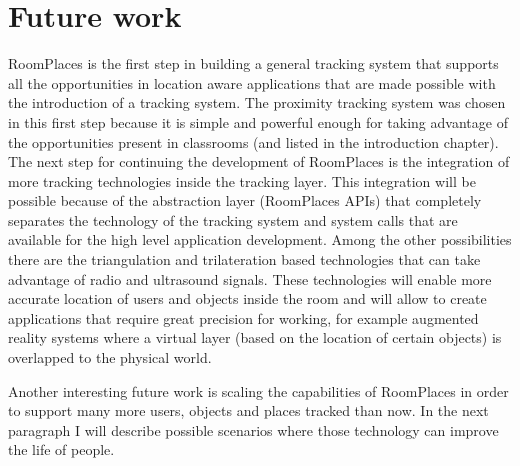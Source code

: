 \section{Future work}

RoomPlaces is the first step in building a general tracking system that supports all the opportunities in location aware applications that are made possible with the introduction of a tracking system. The proximity tracking system was chosen in this first step because it is simple and powerful enough for taking advantage of the opportunities present in classrooms (and listed in the introduction chapter). The next step for continuing the development of RoomPlaces is the integration of more tracking technologies inside the tracking layer. This integration will be possible because of the abstraction layer (RoomPlaces APIs) that completely separates the technology of the tracking system and system calls that are available for the high level application development. Among the other possibilities there are the triangulation and trilateration based technologies that can take advantage of radio and ultrasound signals. These technologies will enable more accurate location of users and objects inside the room and will allow to create applications that require great precision for working, for example augmented reality systems where a virtual layer (based on the location of certain objects) is overlapped to the physical world.

Another interesting future work is scaling the capabilities of RoomPlaces in order to support many more users, objects and places tracked than now. In the next paragraph I will describe possible scenarios where those technology can improve the life of people.

